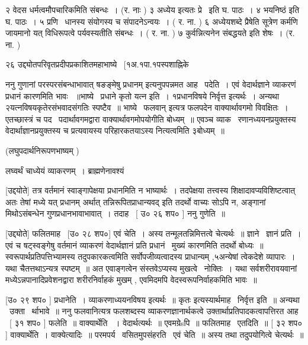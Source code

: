 \documentclass[11pt, openany]{book}
\begin{document}
२ वेदस धर्मत्वमौपचारिकमिति संबन्धः~। (र. नाः ) ३ अध्येय इत्यतः प्रे \textendash\ 
इति घ. पाठः~। ४ {\qt भयनिष्ठं} इति घ. पाठः~। ५ प्रणि \textendash\ धानस्य संयोगस्य च
संपादनेऽन्वयः~। ( र. ना. ) ६ अध्येयशब्दे प्रैषेति सूत्रेण कर्मणि जायमानो
यत् विधिरूपत्वे पर्यवस्यतीति संबन्धः~। ( र. ना. ) ७ कुर्वन्नित्यनेन
संबद्धयते इति शेषः~। (र. ना. ) 

२६ उद्द्योतपरिवृतप्रदीपप्रकाशितमहाभाष्ये \textendash\ [१अ.१पा.१पस्पशाह्निके 



ननु गुणानां परस्परसंबन्धाभावात् {\qt षङङ्मेषु प्रधानम्} इत्यनुपपन्नमत
आह \textendash\ पदेति~। एवं वेदार्थज्ञाने व्याकरणं प्रधानं कारणमिति भावः
~॥भाष्ये \textendash\ प्रधाने कृतो यत्न इति~। १प्रधानविषये निर्वृत्त इत्यर्थः~। 
अन्यथा २यत्नविषयकृतेरसंभवादसंगतिः स्पष्टैव~॥ भाष्ये \textendash\ {\qt  फलवान्}
इत्यत्र फलपदेन वाक्यार्थावगमो विवक्षितः~। एतच्छास्त्रं च पद \textendash\ 
पदार्थावगमद्वारा वाक्यार्थावगमोपयोगीति बोध्यम्~॥ एवञ्च व्याक \textendash\ 
रणानध्ययनप्रयुक्तस्य वेदार्थाज्ञानप्रयुक्तस्य च प्रत्यवायस्य
परिहारकतयाऽस्य नित्यत्वमिति ३बोध्यम्~॥ 

 (लघुपदार्थनिरूपणभाष्यम् ) 

लघ्वर्थं चाध्येयं व्याकरणम्~। {\qt ब्राह्मणेनावश्यं}



 [उद्दयोते] तत्र वर्तमानं स्वाङ्गापेक्षया प्रधानमिति न भाष्यार्थः~। 
तदपेक्षया तत्त्वस्य शिक्षादावप्यविशिष्टत्वात् अतः तेषां मध्ये यत्
प्रधानम् अर्थात् तन्निरूपितप्राधान्यवद् इति तदर्थो वाच्यः सोऽपि न,
अङ्गानां मिथोऽसंबन्धेन गुणप्रधानभावाभावात्~। तदाह \textendash\ [ उ० २६ शप० ]
ननु गुणेति~॥ 

 [उद्द्योते] फलितमाह \textendash\ [उ० २८ शप०] एवं चेति~। अस्य
तन्मूलतन्निमित्तत्वे चेत्यर्थः~॥ ज्ञाने \textendash\ ज्ञानं प्रति~। एवं च
षट्स्वङ्गेषु वर्तमानं व्याकरणं वेदार्थज्ञानं प्रति प्रधानं \textendash\ मुख्यं
कारणमिति तदर्थो बोध्यः~॥ स्वरूपार्थप्रतिपत्तिभ्यामस्य तदुपकारकत्वमिति
सर्वोपजीव्यत्वादस्य प्राधान्यम् ,५अन्येषां त्वेकदेशे व्यापारः~। यथा
चैतत्तथाऽन्यत्र स्पष्टम्~॥ अत एवाङ्गत्वेन संस्तवेऽप्यस्य मुखत्वे \textendash\ 
नोक्तिः~। यथा सर्वशरीरावयवानां मध्येऽन्नपानादिप्रवेशनद्वारा
शरीरनिर्वाहकं मुखम् , एवमिदमपि वेदस्वरूपनिर्वाहकमिति भावः~॥ 

 [उ० २९ शप० ] प्रधानेति~। व्याकरणाध्ययनविषय इत्यर्थः~॥ कृतः
इत्यस्यार्थमाह \textendash\ निर्वृत्त इति~॥ अन्यथा \textendash\ उक्ता \textendash\ र्थाभावे~॥ ननु
फलवानित्यत्र फलशब्दस्य व्याकरणज्ञानार्थकत्वे
उक्तार्थाप्रतिपादकत्वापत्तिरत आह \textendash\ [ ३१ शप० ] फलेति~॥ वाक्यार्थेति
~। वेदार्थत्यर्थः~॥ एवमग्रेsपि~॥ फलितमाह \textendash\ एतदिति~॥ [ ३२ शप० ]
वाक्यार्थेति~। वाक्येत्यादिः~॥ परमपर्य \textendash\ वसितमुपसंहरति \textendash\ एवं चेति~॥
अस्य तथा तदुपयोगित्वे चेत्यर्थः~॥ 
\end{document}
